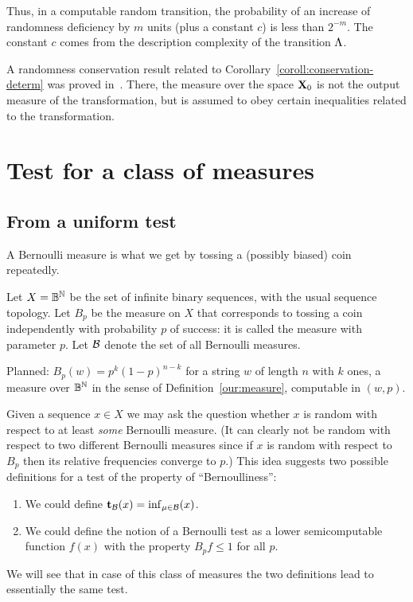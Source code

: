 Thus, in a computable random transition,
the probability of an increase of randomness deficiency by
\( m \) units (plus a constant \( c \)) is less than \( 2^{-m} \).
The constant \( c \) comes from the description complexity 
of the transition \( \Lambda \).

A randomness conservation result related to 
Corollary~\ref{coroll:conservation-determ} was proved 
in~\cite{HertlingWeihrauchRand98}.
There, the measure over the space \( \mathbf{X}_{0} \) is not the output
measure of the transformation, but is assumed to
obey certain inequalities related to the transformation.


\section{Test for a class of measures}

\subsection{From a uniform test}

A Bernoulli measure is what we get by tossing a (possibly biased) coin
repeatedly.

\begin{definition}
  \label{def:g4.2.1}
Let \( X=\mathbb{B}^{\mathbb{N}} \) be the set of infinite binary sequences, with the usual
sequence topology.
Let \( B_{p} \) be the measure on \( X \) that corresponds to tossing a coin
independently with probability \( p \) of success: it is called the 
measure with parameter \( p \).
Let \( \mathcal{B} \) denote the set of all Bernoulli measures. 
\end{definition}

\begin{formalization}
Planned: $B_{p}(w) = p^{k}(1-p)^{n-k}$ for a string $w$ of length $n$ with $k$ ones, a measure over
$\mathbb{B}^{\mathbb{N}}$ in the sense of Definition~\ref{our:measure}, computable in $(w,p)$.
\end{formalization}

Given a sequence \( x\in X \) we may ask the question whether \( x \) is random with
respect to at least \emph{some} Bernoulli measure.
(It can clearly not be random with respect to two different Bernoulli measures
since if \( x \) is random with respect to \( B_{p} \) then its relative frequencies
converge to \( p \).)
This idea suggests two possible definitions for a test of the property of
``Bernoulliness'': 
 \begin{enumerate}
  \item We could define \( \mathbf{t}_{\mathcal{B}}(x) = \inf_{\mu\in\mathcal{B}}(x) \).
  \item We could define the notion of a Bernoulli test as a lower semicomputable
    function \( f(x) \) with the property \( B_{p} f\le 1 \) for all \( p \).
 \end{enumerate}
We will see that in case of this class of measures the two definitions lead to
essentially the same test.

